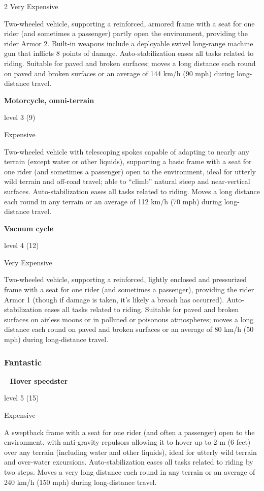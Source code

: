 \begin{multicols}{2}
Very Expensive 

Two-wheeled vehicle, supporting a reinforced, armored frame with a seat for one rider (and sometimes a passenger) partly open the environment, providing the rider Armor 2. Built-in weapons include a deployable swivel long-range machine gun that inflicts 8 points of damage. Auto-stabilization eases all tasks related to riding. Suitable for paved and broken surfaces; moves a long distance each round on paved and broken surfaces or an average of 144 km/h (90 mph) during long-distance travel. 

\textbf{Motorcycle, omni-terrain}

level 3 (9) 

Expensive 

Two-wheeled vehicle with telescoping spokes capable of adapting to nearly any terrain (except water or other liquids), supporting a basic frame with a seat for one rider (and sometimes a passenger) open to the environment, ideal for utterly wild terrain and off-road travel; able to “climb” natural steep and near-vertical surfaces. Auto-stabilization eases all tasks related to riding. Moves a long distance each round in any terrain or an average of 112 km/h (70 mph) during long-distance travel. 

\textbf{Vacuum cycle}

level 4 (12) 

Very Expensive 

Two-wheeled vehicle, supporting a reinforced, lightly enclosed and pressurized frame with a seat for one rider (and sometimes a passenger), providing the rider Armor 1 (though if damage is taken, it’s likely a breach has occurred). Auto-stabilization eases all tasks related to riding. Suitable for paved and broken surfaces on airless moons or in polluted or poisonous atmospheres; moves a long distance each round on paved and broken surfaces or an average of 80 km/h (50 mph) during long-distance travel. 

\subsubsection{Fantastic}
 
\textbf{Hover speedster}

level 5 (15) 

Expensive 

A sweptback frame with a seat for one rider (and often a passenger) open to the environment, with anti-gravity repulsors allowing it to hover up to 2 m (6 feet) over any terrain (including water and other liquids), ideal for utterly wild terrain and over-water excursions. Auto-stabilization eases all tasks related to riding by two steps. Moves a very long distance each round in any terrain or an average of 240 km/h (150 mph) during long-distance travel. 


\end{multicols}

